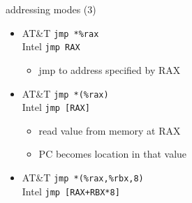 \begin{frame}[fragile,label=addressing3]{addressing modes (3)}
    \begin{itemize}
        \item {\small AT\&T} {\tt jmp *\%rax} \\
            {\small Intel} {\tt jmp RAX}
        \begin{itemize}
        \item jmp to address specified by RAX
        \end{itemize}
    \item {\small AT\&T} {\tt jmp *(\%rax)} \\
        {\small Intel} {\tt jmp [RAX]}
        \begin{itemize}
        \item read value from memory at RAX
        \item PC becomes location in that value
        \end{itemize}
    \item {\small AT\&T} {\tt jmp *(\%rax,\%rbx,8)} \\
        {\small Intel} {\tt jmp [RAX+RBX*8]}
    \end{itemize}
\end{frame}


